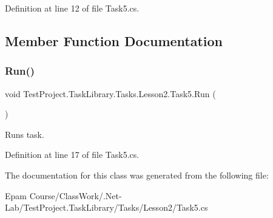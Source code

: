 Definition at line 12 of file Task5.\+cs.



\subsection{Member Function Documentation}
\mbox{\label{class_test_project_1_1_task_library_1_1_tasks_1_1_lesson2_1_1_task5_a2ee534c9d0a591e99b5d8bf5062e1a97}} 
\subsubsection{\texorpdfstring{Run()}{Run()}}
{\footnotesize\ttfamily void Test\+Project.\+Task\+Library.\+Tasks.\+Lesson2.\+Task5.\+Run (\begin{DoxyParamCaption}{ }\end{DoxyParamCaption})}



Runs task. 



Definition at line 17 of file Task5.\+cs.



The documentation for this class was generated from the following file\+:\begin{DoxyCompactItemize}
\item 
Epam Course/\+Class\+Work/.\+Net-\/\+Lab/\+Test\+Project.\+Task\+Library/\+Tasks/\+Lesson2/Task5.\+cs\end{DoxyCompactItemize}
